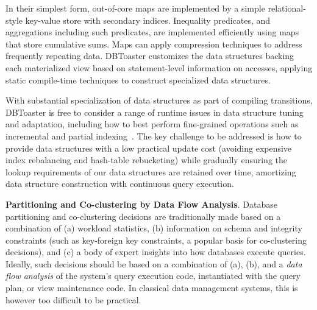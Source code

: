 In their simplest form, out-of-core maps are implemented by a simple
relational-style key-value store with secondary indices\cite{berkeleydb}.
Inequality predicates, and aggregations including such predicates, are
implemented efficiently using maps that store cumulative
sums\cite{rangequeries}.  Maps can apply compression techniques to address
frequently repeating data.
DBToaster customizes the data structures backing each materialized view based
on statement-level information on accesses, applying static compile-time
techniques to construct specialized data structures.

With substantial specialization of data structures as part of compiling
transitions, DBToaster is free to consider a range of runtime issues in data
structure tuning and adaptation, including how to best perform fine-grained
operations such as incremental and partial
indexing~\cite{stonebreaker-sigrec:89}. The key challenge to be addressed is how
to provide data structures with a low practical update cost (avoiding expensive
index rebalancing and hash-table rebucketing) while gradually ensuring the
lookup requirements of our data structures are retained over time, amortizing data
structure construction with continuous query execution.


\noindent
{\bf Partitioning and Co-clustering by Data Flow Analysis}.
%
Database partitioning and co-clustering decisions
are traditionally made based on a combination of
(a) workload statistics, (b) information on schema and integrity constraints
(such as key-foreign key constraints, a popular basis for co-clustering
decisions), and (c) a body of expert insights into how databases execute
queries. Ideally, such decisions should be based on a combination
of (a), (b), and a {\em data flow analysis}\/ of the system's query execution code,
instantiated with the query plan, or view maintenance code. In classical
data management systems, this is however too difficult to be practical.

